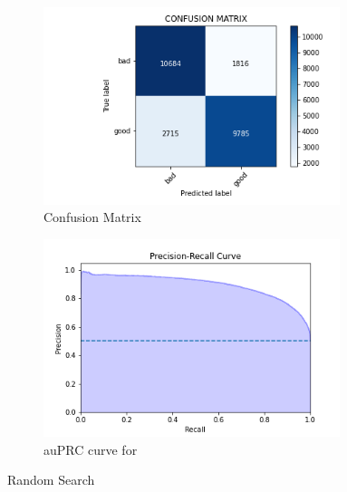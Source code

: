 \documentclass[conference]{IEEEtran}
\begin{document}
\clearpage
\appendix
\begin{figure}[h!]
\begin{subfigure}{0.5\textwidth}
\centering
\includegraphics[width=0.95\textwidth]{random/random-confusion-matrix.png}
\caption{Confusion Matrix}
\end{subfigure}%
\begin{subfigure}{0.5\textwidth}
\centering
\includegraphics[width=0.95\textwidth]{random/Precision-Recall-Curve-random.png}
\caption{auPRC curve for }
\end{subfigure}%
\caption{Random Search}
\end{figure}
\end{document}

